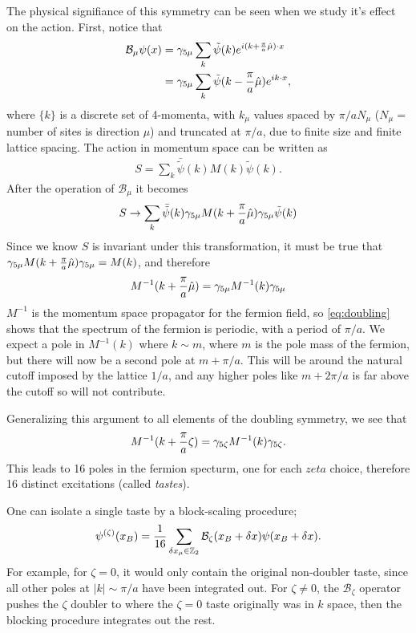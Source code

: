 The physical signifiance of this symmetry can be seen when we study it's effect on the action. First, notice that
\begin{align}
  \mathcal{B}_{\mu} \psi(x) & = \gamma_{5\mu} \sum_k \tilde{\psi}(k) e^{i(k+{\pi\over a}\hat{\mu})\cdot x} \\
  & = \gamma_{5\mu} \sum_k \tilde{\psi}(k-{\pi\over a}\hat{\mu})e^{ik\cdot x},
\end{align}
where $\{k\}$ is a discrete set of 4-momenta, with $k_{\mu}$ values spaced by $\pi/aN_{\mu}$ ($N_{\mu}=$number of sites is direction $\mu$) and truncated at $\pi/a$, due to finite size and finite lattice spacing. The action in momentum space can be written as
\begin{align}
  S = \sum_k \bar{\tilde{\psi}}(k) M(k) \tilde{\psi}(k).
\end{align}
After the operation of $\mathcal{B}_{\mu}$ it becomes
\begin{align}
  S \to \sum_k \bar{\tilde{\psi}}(k) \gamma_{5\mu} M(k+{\pi\over a}\hat{\mu})\gamma_{5\mu} \tilde{\psi}(k)
\end{align}
Since we know $S$ is invariant under this transformation, it must be true that $\gamma_{5\mu} M(k+{\pi\over a}\hat{\mu})\gamma_{5\mu} = M(k)$, and therefore
\begin{align}
  M^{-1}(k+{\pi\over a}\hat{\mu}) = \gamma_{5\mu} M^{-1}(k) \gamma_{5\mu}
  \label{eq:doubling}
\end{align}
$M^{-1}$ is the momentum space propagator for the fermion field, so \ref{eq:doubling} shows that the spectrum of the fermion is periodic, with a period of $\pi/a$. We expect a pole in $M^{-1}(k)$ where $k \sim m$, where $m$ is the pole mass of the fermion, but there will now be a second pole at $m + \pi/a$. This will be around the natural cutoff imposed by the lattice $1/a$, and any higher poles like $m+2\pi/a$ is far above the cutoff so will not contribute.

Generalizing this argument to all elements of the doubling symmetry, we see that
\begin{align}
  M^{-1}(k+{\pi\over a}\zeta) = \gamma_{5\zeta} M^{-1}(k) \gamma_{5\zeta}.
\end{align}
This leads to 16 poles in the fermion specturm, one for each $zeta$ choice, therefore 16 distinct excitations (called \textit{tastes}).

One can isolate a single taste by a block-scaling procedure;
\begin{align}
  \psi^{(\zeta)}(x_B) = {1\over 16} \sum_{\delta x_{\mu} \in \mathbb{Z}_2} \mathcal{B}_{\zeta}(x_B + \delta x) \psi(x_B + \delta x).
  \label{eq:block-scaling}
\end{align}
For example, for $\zeta = 0$, it would only contain the original non-doubler taste, since all other poles at $|k|\sim\pi/a$ have been integrated out. For $\zeta \neq 0$, the $\mathcal{B}_{\zeta}$ operator pushes the $\zeta$ doubler to where the $\zeta=0$ taste originally was in $k$ space, then the blocking procedure integrates out the rest.

